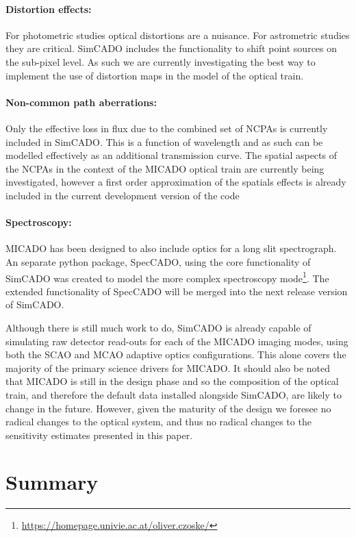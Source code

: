 \paragraph{Distortion effects:} For photometric studies optical distortions are a nuisance. For astrometric studies they are critical. SimCADO includes the functionality to shift point sources on the sub-pixel level. As such we are currently investigating the best way to implement the use of distortion maps in the model of the optical train.

\paragraph{Non-common path aberrations:} Only the effective loss in flux due to the combined set of NCPAs is currently included in SimCADO. This is a function of wavelength and as such can be modelled effectively as an additional transmission curve. The spatial aspects of the NCPAs in the context of the MICADO optical train are currently being investigated, however a first order approximation of the spatials effects is already included in the current development version of the code

\paragraph{Spectroscopy:} MICADO has been designed to also include optics for a long slit spectrograph. An separate python package, SpecCADO, using the core functionality of SimCADO was created to model the more complex spectroscopy mode\footnote{\url{https://homepage.univie.ac.at/oliver.czoske/}}. The extended functionality of SpecCADO will be merged into the next release version of SimCADO. 

Although there is still much work to do, SimCADO is already capable of simulating raw detector read-outs for each of the MICADO imaging modes, using both the SCAO and MCAO adaptive optics configurations. This alone covers the majority of the primary science drivers for MICADO. It should also be noted that MICADO is still in the design phase and so the composition of the optical train, and therefore the default data installed alongside SimCADO, are likely to change in the future. However, given the maturity of the design we foresee no radical changes to the optical system, and thus no radical changes to the sensitivity estimates presented in this paper.


\section{Summary}
\label{sec:conclusions}

